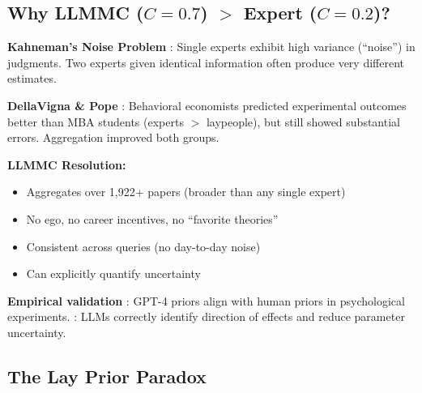 \subsection{Why LLMMC ($C = 0.7$) $>$ Expert ($C = 0.2$)?}
\label{sec:ie-llmmc-advantage}

\begin{tcolorbox}[colback=green!5!white, colframe=green!75!black,
    title=\textbf{The LLMMC Advantage: Empirical Evidence}]

\textbf{Kahneman's Noise Problem} \citep{kahneman2015noise}: Single experts exhibit high variance (``noise'') in judgments. Two experts given identical information often produce very different estimates.

\textbf{DellaVigna \& Pope} \citep{dellavigna2016predict, dellavigna2018motivates}: Behavioral economists predicted experimental outcomes better than MBA students (experts $>$ laypeople), but still showed substantial errors. Aggregation improved both groups.

\textbf{LLMMC Resolution:}
\begin{itemize}[nosep]
    \item Aggregates over 1,922+ papers (broader than any single expert)
    \item No ego, no career incentives, no ``favorite theories''
    \item Consistent across queries (no day-to-day noise)
    \item Can explicitly quantify uncertainty
\end{itemize}

\textbf{Empirical validation} \citep{zhu2024eliciting}: GPT-4 priors align with human priors in psychological experiments. \citep{scientificreports2025llmpriors}: LLMs correctly identify direction of effects and reduce parameter uncertainty.

\end{tcolorbox}

\subsection{The Lay Prior Paradox}
\label{sec:ie-lay-paradox}

